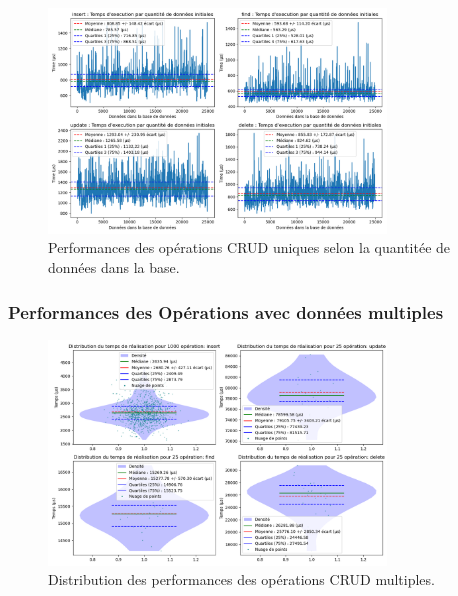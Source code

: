 \documentclass[12pt,a4paper]{report}
\begin{document}
                \begin{figure}[H]
                    \centering
                    \includegraphics[width=0.8\textwidth]{../plots/MySQL/sharding_indexed/test_one_various_data.png}
                    \caption{Performances des opérations CRUD uniques selon la quantitée de données dans la base.}
                    \label{fig:mysql_cluster_global_one_various_indexed}
                \end{figure}

            \subsubsection{Performances des Opérations avec données multiples}
                
                \begin{figure}[H]
                    \centering
                    \includegraphics[width=0.8\textwidth]{../plots/MySQL/sharding_indexed/global_test_many.png}
                    \caption{Distribution des performances des opérations CRUD multiples.}
                    \label{fig:mysql_cluster_global_many_indexed}
                \end{figure}
\end{document}
